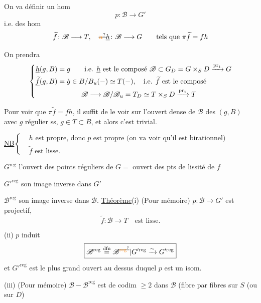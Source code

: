On va définir un hom
\[
p\colon\mathscr B\longrightarrow G'
\]
i.e. des hom
\[
\widetilde f\colon\mathscr B\longrightarrow T,\quad
\deleted{\unsure{u}}\underline h\colon\mathscr B\longrightarrow G
\qquad\text{tels que }\pi\widetilde f=fh
\]

On prendra
\[
\left\{\begin{aligned}
\underline h(g,B)&=g\qquad \text{i.e. }\underline h\text{ est le composé }\mathscr B\subset G_D=G\times_S D\xrightarrow{\mathrm{pr}_1}G\\
\underline{\widetilde f}(g,B)&=\dot g\in B/B_u(-)\simeq T(-),\quad\text{i.e. }\widetilde f\text{ est le composé}\\
&\hspace{12mm}\mathscr B\longrightarrow\mathscr B/\mathscr B_u=T_D\simeq T\times_S D\xrightarrow{\mathrm{pr}_1}T
\end{aligned}\right.
\]

Pour voir que $\pi\widetilde f=fh$, il suffit de le voir sur l'ouvert dense  de $\mathscr B$ des  $(g,B)$ avec $g$ régulier ss,   $g\in T\subset B$, et alors c'est trivial.

\uline{NB}\quad $\left\{\begin{aligned}
&h\text{ est propre, donc }p\text{ est propre (on va voir qu'il est birationnel)}\\
&\widetilde f\text{ est lisse.}
\end{aligned}\right.$

$G^{\mathrm{reg}}$ l'ouvert des points réguliers de $G=$ ouvert des pts de lissité de $f$

$G'^{\mathrm{reg}}$ son image inverse dans $G'$

$\mathscr B^{\mathrm{reg}}$ son image inverse dans $\mathscr B$.
\uline{Théorème}\qquad (i) (Pour mémoire) $p\colon\mathscr B\longrightarrow G'$ est projectif,
\[
\widetilde f\colon\mathscr B\longrightarrow T\quad\text{est lisse.}
\]

(ii) $p$ induit
\[
\boxed{\mathscr B^{\mathrm{reg}}\overset{\mathrm{dfn}}{=}\mathscr B^{\deleted{\unsure{\mathrm{reg}}}}|G'^{\mathrm{reg}}
\xrightarrow{\sim}G'^{\mathrm{reg}}}
\]
et $G'^{\mathrm{reg}}$ est le plus grand ouvert au dessus duquel $p$ est un isom.

(iii) (Pour mémoire) $\mathscr B-\mathscr B^{\mathrm{reg}}$ est de codim $\geq 2$  dans $\mathscr B$ (fibre par fibres sur $S$ (ou sur $D$)

